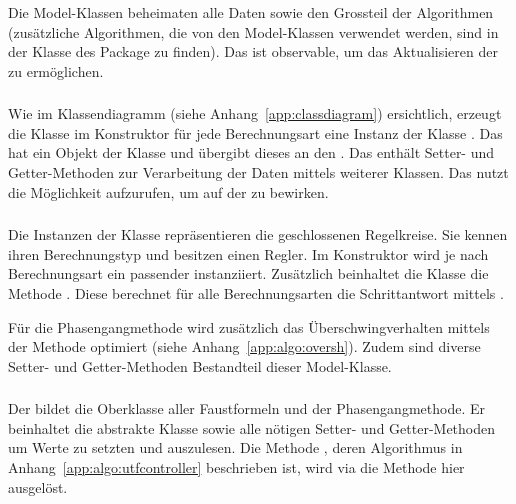 Die Model-Klassen  beheimaten alle Daten  sowie den Grossteil  der Algorithmen
(zus\"atzliche Algorithmen,  die von den Model-Klassen  verwendet werden, sind
in  der  Klasse    des  Package    zu  finden). Das
  ist   observable,  um  das  Aktualisieren   der    zu
erm\"oglichen.

\subsubsection*{}
Wie  im  Klassendiagramm  (siehe  Anhang~\ref{app:classdiagram})  ersichtlich,
erzeugt  die  Klasse   im  Konstruktor  f\"ur jede  Berechnungsart
eine  Instanz der  Klasse . Das   hat  ein Objekt
der  Klasse   und \"ubergibt  dieses an  den . Das
  enth\"alt  Setter-  und  Getter-Methoden  zur  Verarbeitung  der
Daten  mittels  weiterer  Klassen. Das   nutzt  die  M\"oglichkeit
 aufzurufen, um  auf der  zu
bewirken.


\subsubsection*{}
Die    Instanzen   der    Klasse       repr\"asentieren   die
geschlossenen  Regelkreise. Sie  kennen   ihren  Berechnungstyp  und  besitzen
einen  Regler. Im  Konstruktor  wird  je  nach  Berechnungsart  ein  passender
   instanziiert. Zus\"atzlich  beinhaltet   die  Klasse   die
Methode  . Diese   berechnet  f\"ur   alle  Berechnungsarten
die    Schrittantwort    mittels   .

F\"ur  die  Phasengangmethode  wird  zus\"atzlich  das  \"Uberschwingverhalten
mittels   der   Methode       optimiert   (siehe
Anhang~\ref{app:algo:oversh}).  Zudem sind diverse Setter- und Getter-Methoden
Bestandteil dieser Model-Klasse.


\subsubsection*{}
Der    bildet  die  Oberklasse  aller  Faustformeln  und  der
Phasengangmethode. Er  beinhaltet  die   abstrakte  Klasse  
sowie  alle  n\"otigen  Setter-  und   Getter-Methoden  um  Werte  zu  setzten
und  auszulesen.  Die  Methode  ,  deren Algorithmus  in
Anhang~\ref{app:algo:utfcontroller}  beschrieben  ist,  wird via  die  Methode
 hier ausgel\"ost.


